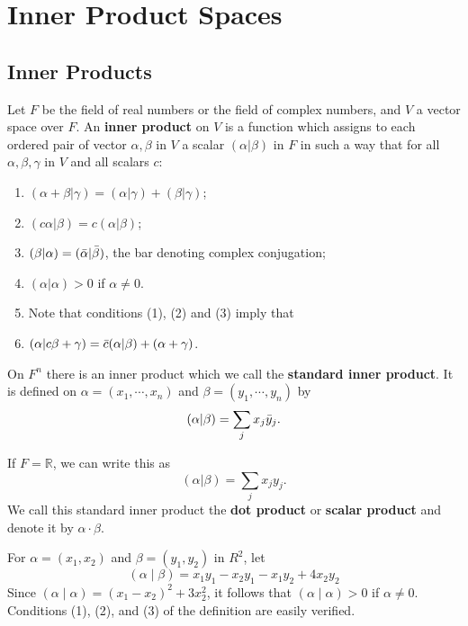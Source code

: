 \documentclass[main.tex]{subfiles}
\begin{document}
\chapter{Inner Product Spaces}
\section{Inner Products}

\begin{definition}
Let $F$ be the field of real numbers or the field of complex numbers, and $V$ a vector space over $F$. An \textbf{inner product} on $V$ is a function which assigns to each ordered pair of vector $\alpha, \beta$ in $V$ a scalar $(\alpha | \beta)$ in $F$ in such a way that for all $\alpha, \beta, \gamma$ in $V$ and all scalars $c$: 
\begin{enumerate}
    \item $(\alpha + \beta | \gamma) = (\alpha | \gamma) + (\beta | \gamma)$;
    \item $(c \alpha | \beta) = c(\alpha | \beta)$;
    \item $(\beta | \alpha) = ( \Bar{\alpha} | \Bar{\beta})$, the bar denoting complex conjugation;
    \item $( \alpha | \alpha ) > 0$ if $\alpha \neq 0$. \\
    \item[] Note that conditions (1), (2) and (3) imply that
    \item $(\alpha | c \beta + \gamma) = \Bar{c} (\alpha | \beta ) + (\alpha + \gamma)$. 
\end{enumerate}
\end{definition}

\begin{example}
On $F^n$ there is an inner product which we call the \textbf{standard inner product}. It is defined on $\alpha = (x_1, \cdots, x_n)$ and $\beta = (y_1, \cdots, y_n)$ by 
\begin{equation}
    (\alpha |\beta ) = \sum_j x_j \Bar{y}_j.
\end{equation}

If $F = \mathbb{R}$, we can write this as 
\begin{equation}
    (\alpha |\beta ) = \sum_j x_j y_j. 
\end{equation}
We call this standard inner product the \textbf{dot product} or \textbf{scalar product} and denote it by $\alpha \cdot \beta$. 
\end{example}

\begin{example}
    For $\alpha=\left(x_1, x_2\right)$ and $\beta=\left(y_1, y_2\right)$ in $R^2$, let
    $$
    (\alpha \mid \beta)=x_1 y_1-x_2 y_1-x_1 y_2+4 x_2 y_2
    $$
    Since $(\alpha \mid \alpha)=\left(x_1-x_2\right)^2+3 x_2^2$, it follows that $(\alpha \mid \alpha)>0$ if $\alpha \neq 0$. Conditions (1), (2), and (3) of the definition are easily verified.
\end{example}
\end{document}
